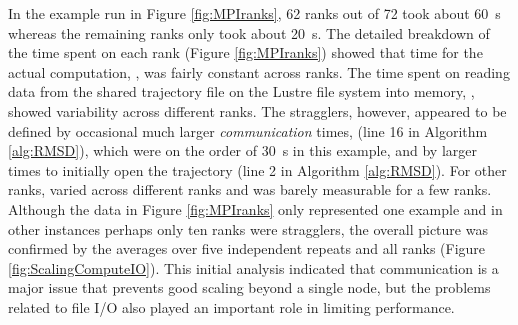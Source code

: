 In the example run in Figure \ref{fig:MPIranks}, 62 ranks out of 72 took about 60~s whereas the remaining ranks only took about 20~s. 
The detailed breakdown of the time spent on each rank (Figure \ref{fig:MPIranks}) showed that time
for the actual computation, \tcomp, was fairly constant across ranks. 
The time spent on reading data from the shared trajectory file on the Lustre file system into memory, \tIO, showed variability across different ranks. 
The stragglers, however, appeared to be defined by occasional much larger \emph{communication} times, \tcomm (line 16 in Algorithm \ref{alg:RMSD}), which were on the order of 30~s in this example, and by larger times to initially open the trajectory (line 2 in Algorithm \ref{alg:RMSD}).
For other ranks, \tcomm varied across different ranks and was barely measurable for a few ranks.
Although the data in Figure \ref{fig:MPIranks} only represented one example and in other instances perhaps only ten ranks were stragglers, the overall picture was confirmed by the averages over five independent repeats and all ranks (Figure \ref{fig:ScalingComputeIO}).
This initial analysis indicated that communication is a major issue that prevents good scaling beyond a single node, but the problems related to file I/O also played an important role in limiting performance.


